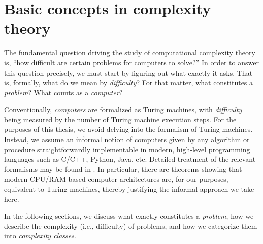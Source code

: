 \chapter{Basic concepts in complexity theory}
\label{ch:background}

The fundamental question driving the study of computational complexity theory
is, ``how difficult are certain problems for computers to solve?''  In order to
answer this question precisely, we must start by figuring out what exactly it
asks.  That is, formally, what do we mean by \emph{difficulty}?  For that
matter, what constitutes a \emph{problem}?  What counts as a \emph{computer}?

Conventionally, \emph{computers} are formalized as Turing machines, with
\emph{difficulty} being measured by the number of Turing machine execution
steps.  For the purposes of this thesis, we avoid delving into the formalism of
Turing machines.  Instead, we assume an informal notion of computers given by
any algorithm or procedure straightforwardly implementable in modern,
high-level programming languages such as C/C++, Python, Java, etc.  Detailed
treatment of the relevant formalisms may be found in \citet[Chapter
2]{papadimitriou.cc}.  In particular, there are theorems \citep[Theorem
2.5]{papadimitriou.cc} showing that modern CPU/RAM-based computer architectures
are, for our purposes, equivalent to Turing machines, thereby justifying the
informal approach we take here.

In the following sections, we discuss what exactly constitutes a \emph{problem},
how we describe the complexity (i.e., difficulty) of problems, and how we
categorize them into \emph{complexity classes}.





